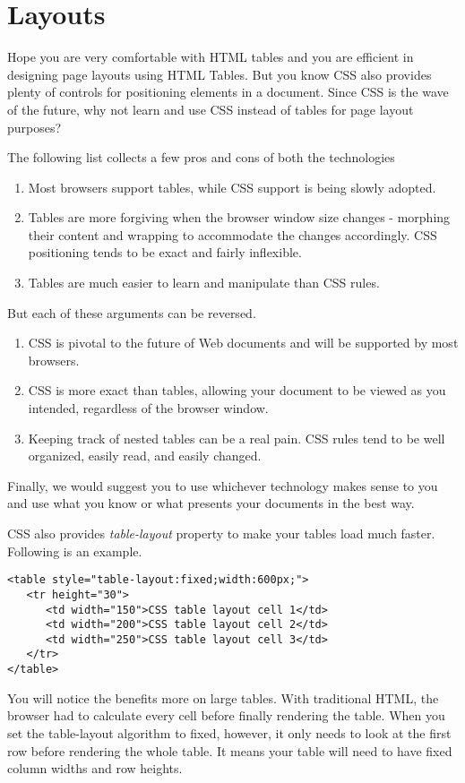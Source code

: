 \documentclass[a4paper,oneside]{book}
\numberwithin{equation}{chapter}
\begin{document}
\section{Layouts}
Hope you are very comfortable with HTML tables and you are efficient in designing page layouts using HTML Tables. But you know CSS also provides plenty of controls for positioning elements in a document. Since CSS is the wave of the future, why not learn and use CSS instead of tables for page layout purposes?

The following list collects a few pros and cons of both the technologies
\begin{enumerate}
\item Most browsers support tables, while CSS support is being slowly adopted.
\item Tables are more forgiving when the browser window size changes - morphing their content and wrapping to accommodate the changes accordingly. CSS positioning tends to be exact and fairly inflexible.
\item Tables are much easier to learn and manipulate than CSS rules.
\end{enumerate}
But each of these arguments can be reversed.
\begin{enumerate}
\item CSS is pivotal to the future of Web documents and will be supported by most browsers.
\item CSS is more exact than tables, allowing your document to be viewed as you intended, regardless of the browser window.
\item Keeping track of nested tables can be a real pain. CSS rules tend to be well organized, easily read, and easily changed.
\end{enumerate}

Finally, we would suggest you to use whichever technology makes sense to you and use what you know or what presents your documents in the best way.

CSS also provides \textit{table-layout} property to make your tables load much faster. Following is an example.
\begin{verbatim}
<table style="table-layout:fixed;width:600px;">
   <tr height="30">
      <td width="150">CSS table layout cell 1</td>
      <td width="200">CSS table layout cell 2</td>
      <td width="250">CSS table layout cell 3</td>
   </tr>
</table>
\end{verbatim}
You will notice the benefits more on large tables. With traditional HTML, the browser had to calculate every cell before finally rendering the table. When you set the table-layout algorithm to fixed, however, it only needs to look at the first row before rendering the whole table. It means your table will need to have fixed column widths and row heights.
\end{document}
